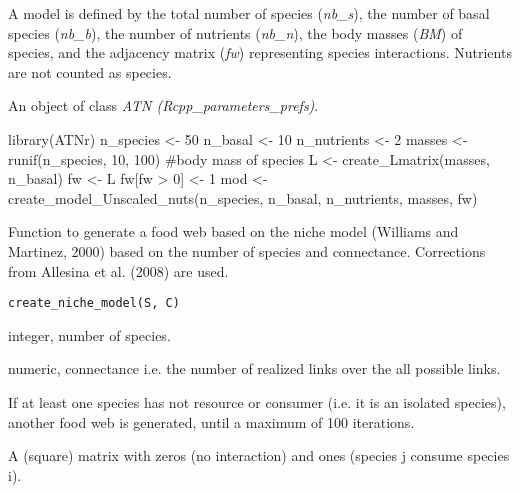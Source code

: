 \documentclass[letterpaper]{book}
\begin{document}
%
\begin{Details}\relax
A model is defined by the total number of species
(\emph{nb\_s}), the number of basal species (\emph{nb\_b}),
the number of nutrients (\emph{nb\_n}), the body masses
(\emph{BM}) of species, and the adjacency matrix (\emph{fw})
representing species interactions.
Nutrients are not counted as species.
\end{Details}
%
\begin{Value}
An object of class \emph{ATN (Rcpp\_parameters\_prefs)}.
\end{Value}
%
\begin{Examples}
\begin{ExampleCode}
library(ATNr)
n_species <- 50
n_basal <- 10
n_nutrients <- 2
masses <- runif(n_species, 10, 100) #body mass of species
L <- create_Lmatrix(masses, n_basal)
fw <- L
fw[fw > 0] <- 1
mod <- create_model_Unscaled_nuts(n_species, n_basal, n_nutrients, masses, fw)
\end{ExampleCode}
\end{Examples}
%
\begin{Description}\relax
Function to generate a food web based on the niche model
(Williams and Martinez, 2000) based on the number of species and
connectance. Corrections from Allesina et al. (2008) are used.
\end{Description}
%
\begin{Usage}
\begin{verbatim}
create_niche_model(S, C)
\end{verbatim}
\end{Usage}
%
\begin{Arguments}
\begin{ldescription}
\item[\code{S}] integer, number of species.

\item[\code{C}] numeric, connectance i.e. the number of realized links over the all
possible links.
\end{ldescription}
\end{Arguments}
%
\begin{Details}\relax
If at least one species has not resource or consumer (i.e. it is an
isolated species), another food web is generated, until a maximum of 100
iterations.
\end{Details}
%
\begin{Value}
A (square) matrix with zeros (no interaction) and ones (species j
consume species i).
\end{Value}
\end{document}
